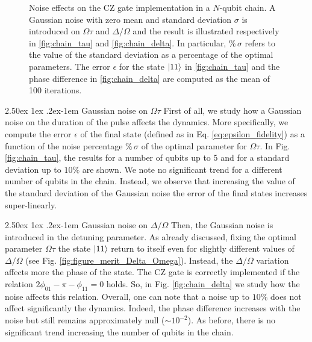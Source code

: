 \documentclass[rmp,10pt,onecolumn,fleqn,notitlepage]{revtex4-1}
\makeatletter
\renewcommand{\paragraph}{%
    \@startsection{paragraph}{4}%
    {\z@}{2.50ex \@plus 1ex \@minus .2ex}{-1em}%
    {\bf\sffamily}%
}
\makeatother
\begin{document}
\begin{figure}[H]
\begin{minipage}[]{0.49\linewidth}
\end{minipage}
\caption{Noise effects on the CZ gate implementation in a $N$-qubit chain. A Gaussian noise with zero mean and standard deviation $\sigma$ is introduced on $\Omega\tau$ and $\Delta/\Omega$ and the result is illustrated respectively in \ref{fig:chain_tau} and \ref{fig:chain_delta}. In particular, $\% \, \sigma$ refers to the value of the standard deviation as a percentage of the optimal parameters. 
The error $\epsilon$ for the state $\left\vert{11}\right\rangle$ in \ref{fig:chain_tau} and the phase difference in \ref{fig:chain_delta} are computed as the mean of 100 iterations.}
\label{fig:chain_results}
\end{figure}


\paragraph{Gaussian noise on $\Omega \tau$} First of all, we study how a Gaussian noise on the duration of the pulse affects the dynamics. More specifically, we compute the error $\epsilon$ of the final state (defined as in Eq. \eqref{eq:epsilon_fidelity}) as a function of the noise percentage $\% \, \sigma$ of the optimal parameter for $\Omega \tau$. In Fig. \ref{fig:chain_tau}, the results for a number of qubits up to 5 and for a standard deviation up to $10\%$ are shown. We note no significant trend for a different number of qubits in the chain. Instead, we observe that increasing the value of the standard deviation of the Gaussian noise the error of the final states increases super-linearly. 


\paragraph{Gaussian noise on $\Delta/\Omega$} Then, the Gaussian noise is introduced in the detuning parameter. As already discussed, fixing the optimal parameter $\Omega\tau$ the state $\left\vert{11}\right\rangle$ return to itself even for slightly different values of $\Delta/\Omega$ (see Fig. \ref{fig:figure_merit_Delta_Omega}). Instead, the $\Delta/\Omega$ variation affects more the phase of the state. 
The CZ gate is correctly implemented if the relation $2 \phi_{01} - \pi - \phi_{11} = 0$ holds. So, in Fig. \ref{fig:chain_delta} we study how the noise affects this relation.
Overall, one can note that a noise up to $10\%$ does not affect significantly the dynamics. Indeed, the phase difference increases with the noise but still remains approximately null ($\sim 10^{-2}$). As before, there is no significant trend increasing the number of qubits in the chain. 
\end{document}

